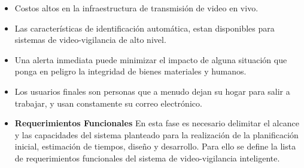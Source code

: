 \begin{itemize}
    \item Costos altos en la infraestructura de transmisión de video en vivo.
    \item Las características de identificación automática, estan disponibles para sistemas de video-vigilancia de alto nivel.
    \item Una alerta inmediata puede minimizar el impacto de alguna situación que ponga en peligro la integridad de bienes materiales y humanos.
    \item Los usuarios finales son personas que a menudo dejan su hogar para salir a trabajar, y usan constamente su correo electrónico.
\end{itemize}

\begin{itemize}
    \item \textbf{Requerimientos Funcionales}
    En esta fase es necesario delimitar el alcance y las capacidades del sistema planteado para la realización de la planificación inicial, estimación de tiempos, diseño y desarrollo. Para ello se define la lista de requerimientos funcionales del sistema de video-vigilancia inteligente.
    

\end{itemize}
